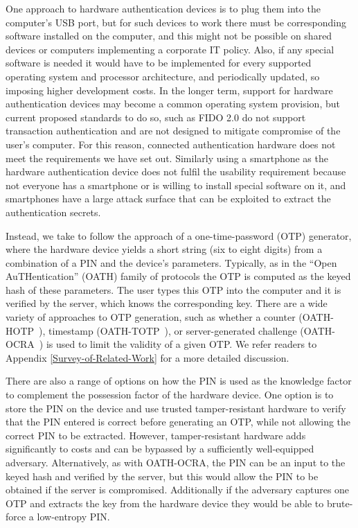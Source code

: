 One approach to hardware authentication devices is to plug them into the computer's USB port, but for such devices to work there must be corresponding software installed on the computer, and this might not be possible on shared devices or computers implementing a corporate IT policy.
Also, if any special software is needed it would have to be implemented for every supported operating system and processor architecture, and periodically updated, so imposing higher development costs.
In the longer term, support for hardware authentication devices may become a common operating system provision, but current proposed standards to do so, such as FIDO 2.0 do not support transaction authentication and are not designed to mitigate compromise of the user's computer.
For this reason, connected authentication hardware does not meet the requirements we have set out.
Similarly using a smartphone as the hardware authentication device does not fulfil the usability requirement because not everyone has a smartphone or is willing to install special software on it, and smartphones have a large attack surface that can be exploited to extract the authentication secrets.

Instead, we take to follow the approach of a one-time-password (OTP) generator, where the hardware device yields a short string (\eg six to eight digits) from a combination of a PIN and the device's parameters. Typically, as in the ``Open AuTHentication'' (OATH) family of protocols the OTP is computed as the keyed hash of these parameters. The user types this OTP into the computer and it is verified by the server, which knows the corresponding key. There are a wide variety of approaches to OTP generation, such as whether a counter (\eg OATH-HOTP~\cite{oath-hotp}), timestamp (\eg OATH-TOTP~\cite{oath-totp}), or server-generated challenge (\eg OATH-OCRA~\cite{oath-ocra}) is used to limit the validity of a given OTP.  We refer readers to Appendix \ref{Survey-of-Related-Work} for a more detailed discussion.

There are also a range of options on how the PIN is used as the knowledge factor to complement the possession factor of the hardware device.
One option is to store the PIN on the device and use trusted tamper-resistant hardware to verify that the PIN entered is correct before generating an OTP, while not allowing the correct PIN to be extracted.
However, tamper-resistant hardware adds significantly to costs and can be bypassed by a sufficiently well-equipped adversary.
Alternatively, as with OATH-OCRA, the PIN can be an input to the keyed hash and verified by the server, but this would allow the PIN to be obtained if the server is compromised.
Additionally if the adversary captures one OTP and extracts the key from the hardware device they would be able to brute-force a low-entropy PIN.


